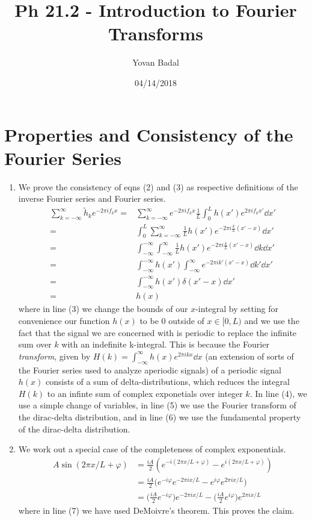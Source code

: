 \documentclass[11pt]{article}
\begin{document}
	\title{Ph 21.2 - Introduction to Fourier Transforms}
	\author{Yovan Badal}
	\date{04/14/2018}
	\maketitle
	
\section{Properties and Consistency of the Fourier Series}
\begin{enumerate}
	\item We prove the consistency of eqns (2) and (3) as respective definitions of the inverse Fourier series and Fourier series.
	\begin{align}
		\sum_{k=-\infty}^{\infty} \tilde h_k e^{-2\pi i f_k x} =& \sum_{k=-\infty}^{\infty} e^{-2\pi i f_k x} \frac{1}{L} \int_0^L h(x')  e^{2\pi i f_k x'} \dd{x'} \\
		=& \int_0^L \sum_{k=-\infty}^{\infty} \frac{1}{L} h(x') e^{-2\pi i \frac{k}{L} (x'-x)} \dd{x'} \\
		=& \int_{-\infty}^{-\infty} \int_{-\infty}^{\infty} \frac{1}{L} h(x') e^{-2\pi i \frac{k}{L} (x'-x)} \dd{k} \dd{x'} \\
		=& \int_{-\infty}^{-\infty} h(x') \int_{-\infty}^{\infty} e^{-2\pi i k' (x'-x)} \dd{k'} \dd{x'} \\
		=& \int_{-\infty}^{-\infty} h(x') \delta(x'-x) \dd{x'} \\
		=& h(x)
	\end{align}
	where in line (3) we change the bounds of our $x$-integral by setting for convenience our function $h(x)$ to be $0$ outside of $x \in [0,L)$ and we use the fact that the signal we are concerned with is periodic to replace the infinite sum over $k$ with an indefinite k-integral. This is because the Fourier \textit{transform}, given by $H(k)=\int_{-\infty}^{\infty} h(x) e^{2 \pi i k x}\dd{x}$ (an extension of sorts of the Fourier series used to analyze aperiodic signals) of a periodic signal $h(x)$ consists of a sum of delta-distributions, which reduces the integral $H(k)$ to an infinte sum of complex exponetials over integer $k$. In line (4), we use a simple change of variables, in line (5) we use the Fourier transform of the dirac-delta distribution, and in line (6) we use the fundamental property of the dirac-delta distribution.
	
	\newpage
	\item We work out a special case of the completeness of complex exponentials.
	\begin{align}
		A\sin (2 \pi x/L + \varphi) &= \frac{i A}{2}(e^{-i(2 \pi x/L + \varphi)} - e^{i(2 \pi x/L + \varphi)}) \\
		&= \frac{i A}{2} \big(e^{-i \varphi} e^{-2 \pi i x/L} - e^{i \varphi} e^{2 \pi i x/L}\big) \\
		&= \bigg(\frac{i A}{2} e^{-i \varphi}\bigg) e^{-2 \pi i x/L} - \bigg(\frac{i A}{2} e^{i \varphi}\bigg) e^{2 \pi i x/L}
	\end{align}
	where in line (7) we have used DeMoivre's theorem. This proves the claim.
	

\end{enumerate}
\end{document}
